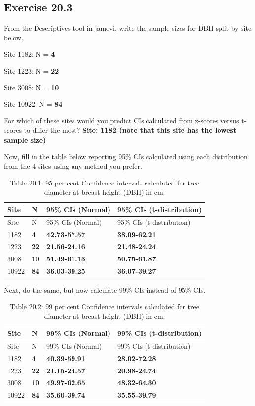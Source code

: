 \documentclass[
  openany]{scrbook}
\begin{document}
\hypertarget{exercise-20.3}{%
\subsection{Exercise 20.3}\label{exercise-20.3}}

From the Descriptives tool in jamovi, write the sample sizes for DBH split by site below.

Site 1182: N = \textbf{4}

Site 1223: N = \textbf{22}

Site 3008: N = \textbf{10}

Site 10922: N = \textbf{84}

For which of these sites would you predict CIs calculated from z-scores versus t- scores to differ the most? \textbf{Site: 1182 (note that this site has the lowest sample size)}

Now, fill in the table below reporting 95\% CIs calculated using each distribution from the 4 sites using any method you prefer.

\begin{longtable}[]{@{}llll@{}}
\caption{Table 20.1: 95 per cent Confidence intervals calculated for tree diameter at breast height (DBH) in cm.}\tabularnewline
\toprule
Site & N & 95\% CIs (Normal) & 95\% CIs (t-distribution) \\
\midrule
\endfirsthead
\toprule
Site & N & 95\% CIs (Normal) & 95\% CIs (t-distribution) \\
\midrule
\endhead
1182 & \textbf{4} & \textbf{42.73-57.57} & \textbf{38.09-62.21} \\
1223 & \textbf{22} & \textbf{21.56-24.16} & \textbf{21.48-24.24} \\
3008 & \textbf{10} & \textbf{51.49-61.13} & \textbf{50.75-61.87} \\
10922 & \textbf{84} & \textbf{36.03-39.25} & \textbf{36.07-39.27} \\
\bottomrule
\end{longtable}

Next, do the same, but now calculate 99\% CIs instead of 95\% CIs.

\begin{longtable}[]{@{}llll@{}}
\caption{Table 20.2: 99 per cent Confidence intervals calculated for tree diameter at breast height (DBH) in cm.}\tabularnewline
\toprule
Site & N & 99\% CIs (Normal) & 99\% CIs (t-distribution) \\
\midrule
\endfirsthead
\toprule
Site & N & 99\% CIs (Normal) & 99\% CIs (t-distribution) \\
\midrule
\endhead
1182 & \textbf{4} & \textbf{40.39-59.91} & \textbf{28.02-72.28} \\
1223 & \textbf{22} & \textbf{21.15-24.57} & \textbf{20.98-24.74} \\
3008 & \textbf{10} & \textbf{49.97-62.65} & \textbf{48.32-64.30} \\
10922 & \textbf{84} & \textbf{35.60-39.74} & \textbf{35.55-39.79} \\
\bottomrule
\end{longtable}
\end{document}
